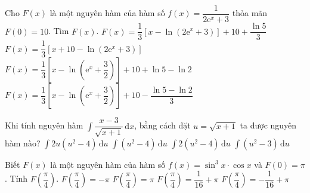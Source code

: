 \begin{ex}%
	Cho $F(x)$ là một nguyên hàm của hàm số $f(x)=\dfrac{1}{2\mathrm{e}^x+3}$ thỏa mãn $F(0)=10$. Tìm $F(x)$. 
	\choice
	{\True $F(x)=\dfrac{1}{3}\left[x-\ln \left(2\mathrm{e}^x+3\right)\right]+10+\dfrac{\ln 5}{3}$}
	{$F(x)=\dfrac{1}{3}\left[x+10-\ln \left(2\mathrm{e}^x+3\right)\right]$}
	{$F(x)=\dfrac{1}{3}\left[x-\ln \left(\mathrm{e}^x+\dfrac{3}{2}\right)\right]+10+\ln 5-\ln 2$}
	{$F(x)=\dfrac{1}{3}\left[x-\ln \left(\mathrm{e}^x+\dfrac{3}{2}\right)\right]+10-\dfrac{\ln 5-\ln 2}{3}$}
\end{ex}
\begin{ex}%
	Khi tính nguyên hàm $\displaystyle\int\dfrac{x-3}{\sqrt{x+1}}\mathrm{\,d}x$, bằng cách đặt $u=\sqrt{x+1}$ ta được nguyên hàm nào?
	\choice
	{$\displaystyle\int 2u\left(u^2-4\right)\mathrm{\,d}u$}
	{$\displaystyle\int\left(u^2-4\right)\mathrm{\,d}u$}
	{\True $\displaystyle\int 2\left(u^2-4\right)\mathrm{\,d}u$}
	{$\displaystyle\int\left(u^2-3\right)\mathrm{\,d}u$}
\end{ex}
\begin{ex}%
	Biết $F(x)$ là một nguyên hàm của hàm số $f(x)=\sin^3x\cdot\cos x$ và $F(0)=\pi$. Tính $F\left(\dfrac{\pi}{4}\right)$. 
	\choice
	{$F\left(\dfrac{\pi}{4}\right)=-\pi$}
	{$F\left(\dfrac{\pi}{4}\right)=\pi$}
	{\True $F\left(\dfrac{\pi}{4}\right)=\dfrac{1}{16}+\pi$}
	{$F\left(\dfrac{\pi}{4}\right)=-\dfrac{1}{16}+\pi$}
\end{ex}
